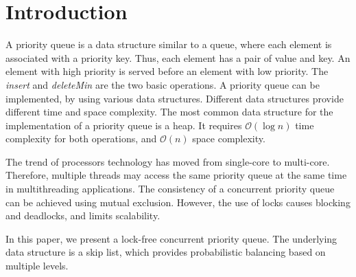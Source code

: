 \section{Introduction}\label{sec:intro}


A priority queue is a data structure similar to a queue, where each element is associated with a priority key.
Thus, each element has a pair of value and key.
An element with high priority is served before an element with low priority.
The \textit{insert} and \textit{deleteMin} are the two basic operations.
A priority queue can be implemented, by using various data structures.
Different data structures provide different time and space complexity.
The most common data structure for the implementation of a priority queue is a heap.
It requires $\mathcal{O}(\log{}n)$ time complexity for both operations, and $\mathcal{O}(n)$ space complexity.


The trend of processors technology has moved from single-core to multi-core.
Therefore, multiple threads may access the same priority queue at the same time in multithreading applications.
The consistency of a concurrent priority queue can be achieved using mutual exclusion.
However, the use of locks causes blocking and deadlocks, and limits scalability.

In this paper, we present a lock-free concurrent priority queue.
The underlying data structure is a skip list, which provides probabilistic balancing based on multiple levels.




